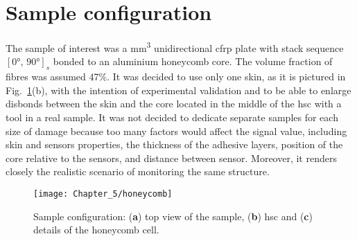 \section{Sample configuration}
\label{sec:sample}

The sample of interest was a  \unit{\cubic\mm} unidirectional \ac{cfrp} plate with stack sequence \(\left[\ang{0},\,\ang{90}\right]_s\) bonded to an aluminium honeycomb core.
The volume fraction of fibres was assumed 47\%.
It was decided to use only one skin, as it is pictured in Fig.~\ref{fig:honeycomb}(b), with the intention of experimental validation and to be able to enlarge disbonds between the skin and the core located in the middle of the \ac{hsc} with a tool in a real sample. 
It was not decided to dedicate separate samples for each size of damage because too many factors would affect the signal value, including skin and sensors properties, the thickness of the adhesive layers, position of the core relative to the sensors, and distance between sensor.
Moreover, it renders closely the realistic scenario of monitoring the same structure.
\begin{figure}[H]
	\begin{center}
		\texttt{[image: Chapter\_5/honeycomb]}
	\end{center}
	\caption{Sample configuration: (\textbf{a}) top view of the sample, (\textbf{b}) \acf{hsc} and (\textbf{c}) details of the honeycomb cell.}
	\label{fig:honeycomb}
\end{figure}

